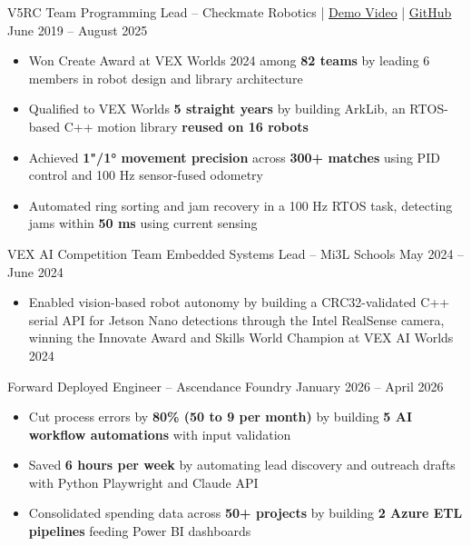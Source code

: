 \documentclass[11pt]{article}       %
\newcommand{\textsb}[1]{{\fontseries{sb}\selectfont #1}}
\begin{document}
\vspace{6pt}

\textsb{V5RC Team Programming Lead} -- Checkmate Robotics | \href{https://youtu.be/Ix-q2ixYf8Y}{\underline{Demo Video}} | \href{https://github.com/16868C/VRC2425-HighStakes}{\underline{GitHub}} \hfill June 2019 -- August 2025 \\
\begin{itemize}
    \item Won Create Award at VEX Worlds 2024 among \textbf{82 teams} by leading 6 members in robot design and library architecture
    \item Qualified to VEX Worlds \textbf{5 straight years} by building ArkLib, an RTOS-based C++ motion library \textbf{reused on 16 robots}
    \item Achieved \textbf{1"/1° movement precision} across \textbf{300+ matches} using PID control and 100 Hz sensor-fused odometry
    \item Automated ring sorting and jam recovery in a 100 Hz RTOS task, detecting jams within \textbf{50 ms} using current sensing
\end{itemize}

\vspace{6pt}

\textsb{VEX AI Competition Team Embedded Systems Lead} -- Mi3L Schools \hfill May 2024 -- June 2024 \\
\begin{itemize}
    \item Enabled vision-based robot autonomy by building a CRC32-validated C++ serial API for Jetson Nano detections through the Intel RealSense camera, winning the Innovate Award and Skills World Champion at VEX AI Worlds 2024
\end{itemize}

\vspace{6pt}

\textsb{Forward Deployed Engineer} -- Ascendance Foundry \hfill January 2026 -- April 2026 \\
\begin{itemize}
    \item Cut process errors by \textbf{80\% (50 to 9 per month)} by building \textbf{5 AI workflow automations} with input validation
    \item Saved \textbf{6 hours per week} by automating lead discovery and outreach drafts with Python Playwright and Claude API
    \item Consolidated spending data across \textbf{50+ projects} by building \textbf{2 Azure ETL pipelines} feeding Power BI dashboards
\end{itemize}
\end{document}
